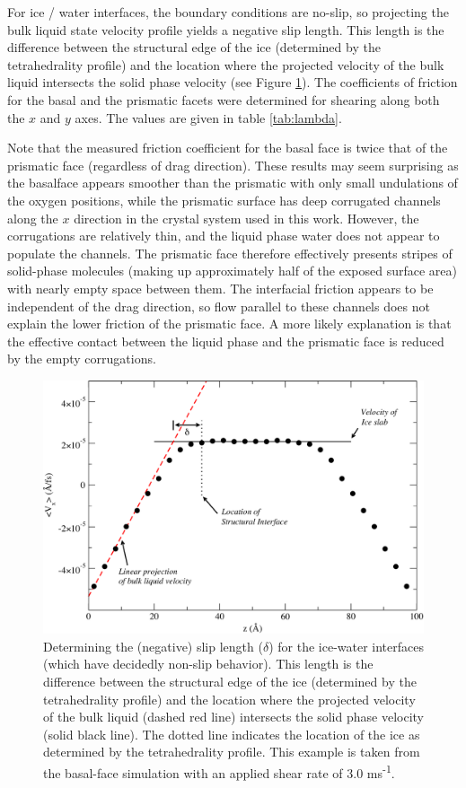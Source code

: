 \documentclass[11pt]{article}
\begin{document}
\begin{doublespace}
For ice / water interfaces, the boundary conditions are no-slip, so
projecting the bulk liquid state velocity profile yields a negative
slip length. This length is the difference between the structural edge
of the ice (determined by the tetrahedrality profile) and the location
where the projected velocity of the bulk liquid intersects the solid
phase velocity (see Figure \ref{fig:delta_example}). The coefficients
of friction for the basal and the prismatic facets were determined for
shearing along both the $x$ and $y$ axes.  The values are given in
table \ref{tab:lambda}. 

Note that the measured friction coefficient for the basal face is
twice that of the prismatic face (regardless of drag direction).
These results may seem surprising as the basalface appears smoother
than the prismatic with only small undulations of the oxygen
positions, while the prismatic surface has deep corrugated channels
along the $x$ direction in the crystal system used in this work.
However, the corrugations are relatively thin, and the liquid phase
water does not appear to populate the channels.  The prismatic face
therefore effectively presents stripes of solid-phase molecules
(making up approximately half of the exposed surface area) with nearly
empty space between them. The interfacial friction appears to be
independent of the drag direction, so flow parallel to these channels
does not explain the lower friction of the prismatic face.  A more
likely explanation is that the effective contact between the liquid
phase and the prismatic face is reduced by the empty corrugations.  

\begin{figure}
\includegraphics[width=\linewidth]{delta_example}
\caption{\label{fig:delta_example} Determining the (negative) slip
  length ($\delta$) for the ice-water interfaces (which have decidedly
  non-slip behavior).  This length is the difference between the
  structural edge of the ice (determined by the tetrahedrality
  profile) and the location where the projected velocity of the bulk
  liquid (dashed red line) intersects the solid phase velocity (solid
  black line).  The dotted line indicates the location of the ice as
  determined by the tetrahedrality profile.  This example is taken
  from the basal-face simulation with an applied shear rate of 3.0 ms\textsuperscript{-1}.}
\end{figure}



\end{doublespace}
\end{document}
